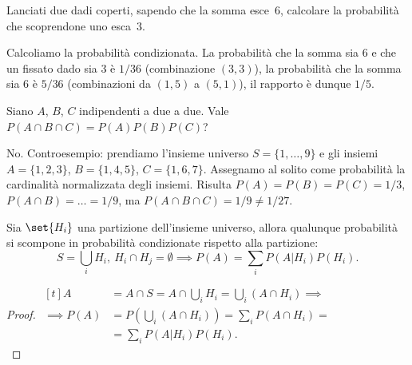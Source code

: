 
\begin{exercise}
	Lanciati due dadi coperti, sapendo che la somma esce~6, calcolare la probabilità che scoprendone uno esca~3.
\end{exercise}

\begin{solution}
	Calcoliamo la probabilità condizionata. La probabilità che la somma sia 6 e che un fissato dado sia 3 è $1/36$ (combinazione $(3,3)$), la probabilità che la somma sia 6 è $5/36$ (combinazioni da $(1,5)$ a $(5,1)$), il rapporto è dunque $1/5$.
\end{solution}

\begin{exercise}
	Siano $A$, $B$, $C$ indipendenti a due a due. Vale $P(A\cap B\cap C)=P(A)P(B)P(C)$?
\end{exercise}

\begin{solution}
	No. Controesempio: prendiamo l'insieme universo
	$S = \{1,\dots,9\}$
	e gli insiemi
	$A = \{1, 2, 3\}$,
	$B = \{1, 4, 5\}$,
	$C = \{1, 6, 7\}$.
	Assegnamo al solito come probabilità la cardinalità normalizzata degli insiemi.
	Risulta $P(A)=P(B)=P(C)=1/3$, $P(A\cap B)=\dots=1/9$, ma $P(A\cap B\cap C)=1/9\neq1/27$.
\end{solution}

\begin{theorem}
	Sia $\set{H_i}$ una partizione dell'insieme universo,
	allora qualunque probabilità si scompone in probabilità condizionate rispetto alla partizione:
	\begin{equation*}
		S=\bigcup_iH_i,\ H_i\cap H_j=\emptyset\implies P(A)=\sum_iP(A|H_i)P(H_i).
	\end{equation*}
\end{theorem}

\begin{proof}
	$\begin{aligned}[t]
		A &= A\cap S = A\cap \bigcup_iH_i = \bigcup_i(A\cap H_i) \implies \\
		\implies P(A) &= P\left(\bigcup_i(A\cap H_i)\right) = \sum_i P(A\cap H_i) = \\
		&= \sum_i P(A|H_i)P(H_i).
	\end{aligned}$\vspace{-1em}\\
\end{proof}
